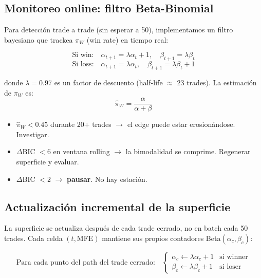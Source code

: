 \documentclass[11pt,a4paper]{article}
\begin{document}
\subsection{Monitoreo online: filtro Beta-Binomial}

Para detecci\'on trade a trade (sin esperar a 50), implementamos un
filtro bayesiano que trackea $\pi_W$ (win rate) en tiempo real:

\begin{equation}
\text{Si win:}\quad \alpha_{t+1} = \lambda\alpha_t + 1, \quad \beta_{t+1} = \lambda\beta_t
\end{equation}
\begin{equation}
\text{Si loss:}\quad \alpha_{t+1} = \lambda\alpha_t, \quad \beta_{t+1} = \lambda\beta_t + 1
\end{equation}

donde $\lambda = 0.97$ es un factor de descuento (half-life $\approx$
23 trades). La estimaci\'on de $\pi_W$ es:
\begin{equation}
\hat{\pi}_W = \frac{\alpha}{\alpha + \beta}
\end{equation}

\begin{tcolorbox}[warning, title=Alertas]
\begin{itemize}[leftmargin=1.5em]
\item $\hat{\pi}_W < 0.45$ durante 20+ trades $\to$ el edge puede
  estar erosion\'andose. Investigar.
\item $\Delta$BIC $< 6$ en ventana rolling $\to$ la bimodalidad se
  comprime. Regenerar superficie y evaluar.
\item $\Delta$BIC $< 2$ $\to$ \textbf{pausar}. No hay estaci\'on.
\end{itemize}
\end{tcolorbox}

\subsection{Actualizaci\'on incremental de la superficie}

La superficie se actualiza despu\'es de cada trade cerrado, no en
batch cada 50 trades. Cada celda $(t, \text{MFE})$ mantiene sus
propios contadores Beta$(\alpha_c, \beta_c)$:

\begin{equation}
\text{Para cada punto del path del trade cerrado:} \quad
\begin{cases}
\alpha_c \leftarrow \lambda\alpha_c + 1 & \text{si winner} \\
\beta_c \leftarrow \lambda\beta_c + 1 & \text{si loser}
\end{cases}
\end{equation}
\end{document}
